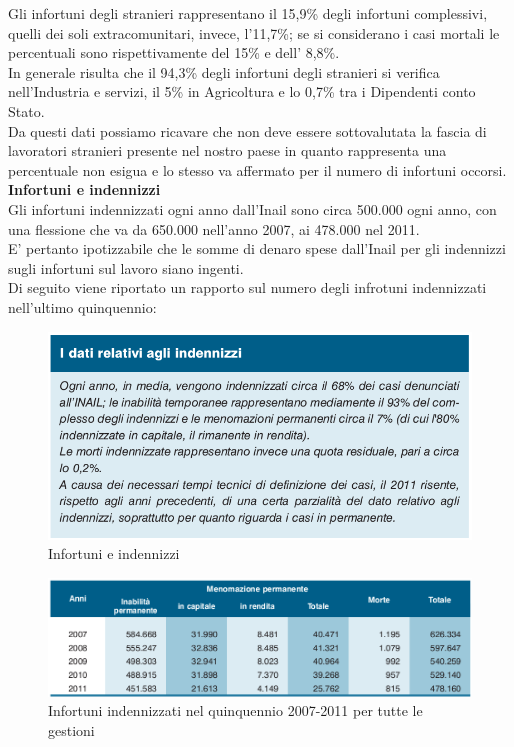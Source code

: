 Gli infortuni degli stranieri rappresentano il 15,9\% degli infortuni complessivi, quelli dei
soli extracomunitari, invece, l’11,7\%; se si considerano i casi mortali le percentuali sono
rispettivamente del 15\% e dell’ 8,8\%.\\
In generale risulta che il 94,3\% degli infortuni degli stranieri si verifica nell’Industria e
servizi, il 5\% in Agricoltura e lo 0,7\% tra i Dipendenti conto Stato.\\
Da questi dati possiamo ricavare che non deve essere sottovalutata la fascia di lavoratori stranieri presente nel nostro paese in quanto rappresenta una percentuale non esigua e lo stesso va affermato per il numero di infortuni occorsi.\\



\textbf{Infortuni e indennizzi}\\
Gli infortuni indennizzati ogni anno dall'Inail sono circa 500.000 ogni anno, con una flessione che va da 650.000 nell'anno 2007, ai 478.000 nel 2011.\\
E' pertanto ipotizzabile che le somme di denaro spese dall'Inail per gli indennizzi sugli infortuni sul lavoro siano ingenti.\\
Di seguito viene riportato un rapporto sul numero degli infrotuni indennizzati nell'ultimo quinquennio:

\begin{figure}[H]
\centering
\includegraphics[scale=0.55]{images/analisiDiMercato/infortuniIndennizzi1}
\caption{Infortuni e indennizzi}
\end{figure}

\begin{figure}[H]
\centering
\includegraphics[scale=0.55]{images/analisiDiMercato/infortuniIndennizzi2}
\caption{Infortuni indennizzati nel quinquennio 2007-2011 per tutte le gestioni}
\end{figure}




